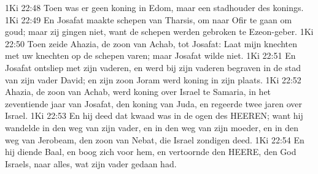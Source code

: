 1Ki 22:48  Toen was er geen koning in Edom, maar een stadhouder des konings.
1Ki 22:49  En Josafat maakte schepen van Tharsis, om naar Ofir te gaan om goud; maar zij gingen niet, want de schepen werden gebroken te Ezeon-geber.
1Ki 22:50  Toen zeide Ahazia, de zoon van Achab, tot Josafat: Laat mijn knechten met uw knechten op de schepen varen; maar Josafat wilde niet.
1Ki 22:51  En Josafat ontsliep met zijn vaderen, en werd bij zijn vaderen begraven in de stad van zijn vader David; en zijn zoon Joram werd koning in zijn plaats.
1Ki 22:52  Ahazia, de zoon van Achab, werd koning over Israel te Samaria, in het zeventiende jaar van Josafat, den koning van Juda, en regeerde twee jaren over Israel.
1Ki 22:53  En hij deed dat kwaad was in de ogen des HEEREN; want hij wandelde in den weg van zijn vader, en in den weg van zijn moeder, en in den weg van Jerobeam, den zoon van Nebat, die Israel zondigen deed.
1Ki 22:54  En hij diende Baal, en boog zich voor hem, en vertoornde den HEERE, den God Israels, naar alles, wat zijn vader gedaan had.



